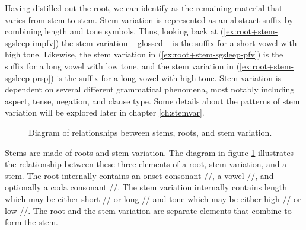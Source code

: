 Having distilled out the root, we can identify  as the remaining material that varies from stem to stem.
Stem variation is represented as an abstract suffix by combining length and tone symbols.
Thus, looking back at (\ref{ex:root+stem-sgsleep-impfv}) the stem variation – glossed  – is the suffix  for a short vowel with high tone.
Likewise, the stem variation in (\ref{ex:root+stem-sgsleep-pfv}) is the suffix  for a long vowel with low tone, and the stem variation in (\ref{ex:root+stem-sgsleep-prsp}) is the suffix  for a long vowel with high tone.
Stem variation is dependent on several different grammatical phenomena, most notably including aspect, tense, negation, and clause type.
Some details about the patterns of stem variation will be explored later in chapter \ref{ch:stemvar}.

\begin{figure}
\centerfloat
{}
\caption{Diagram of relationships between stems, roots, and stem variation.}
\label{fig:root+stem-root-stem-and-variation}
\end{figure}

Stems are made of roots and stem variation.
The diagram in figure \ref{fig:root+stem-root-stem-and-variation} illustrates the relationship between these three elements of a root, stem variation, and a stem.
The root internally contains an onset consonant //, a vowel //, and optionally a coda consonant //.
The stem variation internally contains length which may be either short // or long // and tone which may be either high // or low //.
The root and the stem variation are separate elements that combine to form the stem.

